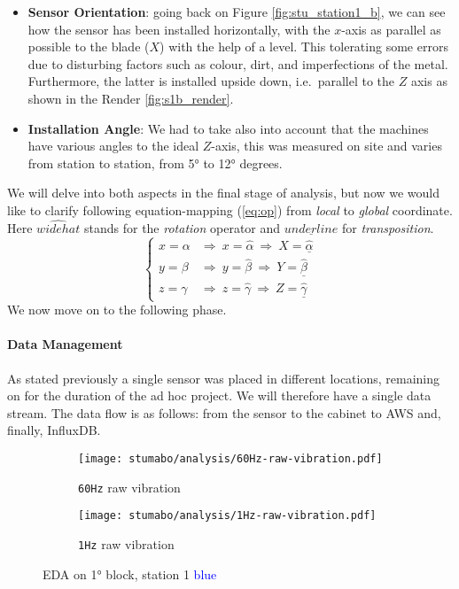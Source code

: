 \begin{itemize}
    \item \textbf{Sensor Orientation}: 
    going back on Figure \ref{fig:stu_station1_b}, we can see how the sensor has been installed horizontally, with the $x$-axis as parallel as possible to the blade ($X$) with 
    the help of a level. 
    This tolerating some errors due to disturbing factors such as colour, dirt, and imperfections of the metal.
    Furthermore, the latter is installed upside down, i.e.\ parallel to the $Z$ axis as shown in the Render \ref{fig:s1b_render}.
    \item \textbf{Installation Angle}:
    We had to take also into account that the machines have various angles to the ideal $Z$-axis, this was measured on site and varies from station to station, from 5° to 12° degrees.
\end{itemize}
We will delve into both aspects in the final stage of analysis, but now we would like to clarify following equation-mapping (\ref{eq:op}) from \textit{local} to \textit{global} coordinate.
Here $\widehat{widehat}$ stands for the \textit{rotation} operator and $\underline{underline}$ for \textit{transposition}. 
\begin{equation}
    \left\{ \begin{array}{cl}
        x = \alpha & \Rightarrow  \ x = \widehat{\alpha} \ \Rightarrow  \ X = \underline{\widehat{\alpha}} \\
        y = \beta & \Rightarrow  \ y = \widehat{\beta} \ \Rightarrow  \ Y = \underline{\widehat{\beta}} \\ 
        z = \gamma & \Rightarrow  \ z = \widehat{\gamma} \ \Rightarrow  \ Z = \underline{\widehat{\gamma}}
        \end{array} \right.
    \label{eq:op}
\end{equation}
We now move on to the following phase.

\paragraph{Data Management}
As stated previously a single sensor was placed in different locations, remaining on for the duration of the ad hoc project. We will therefore have a single data stream.
The data flow is as follows: from the sensor to the cabinet to AWS and, finally, InfluxDB.
\begin{figure}[ht]
    \begin{subfigure}{.495\textwidth}
        \texttt{[image: stumabo/analysis/60Hz-raw-vibration.pdf]}
        \caption{\texttt{60Hz} raw vibration}
        \label{fig:stu_60Hz_raw}
    \end{subfigure}
    \begin{subfigure}{.495\textwidth}
        \texttt{[image: stumabo/analysis/1Hz-raw-vibration.pdf]}
        \caption{\texttt{1Hz} raw vibration}
        \label{fig:stu_1Hz_raw}
    \end{subfigure}
    \caption{\acl{EDA} on 1° block, station 1 \textcolor{blue}{blue}}
    \label{fig:stu_2_raw_data}
\end{figure}

